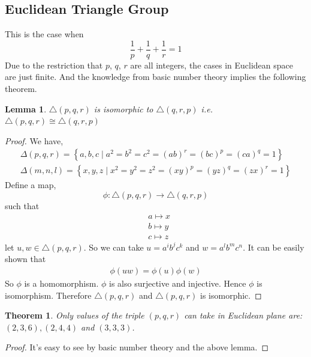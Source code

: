 \documentclass{article}
\newtheorem{Thm}{Theorem}[section]
\newtheorem{lem}{Lemma}[section]
\begin{document}
\subsection{Euclidean Triangle Group}
This is the case when $$\frac{1}{p}+\frac{1}{q}+\frac{1}{r}=1$$
Due to the restriction that $p$, $q$, $r$ are all integers, the cases in Euclidean space are just finite. And the knowledge from basic number theory implies the following theorem.
\begin{lem}
    $\triangle(p, q, r)$ is isomorphic to $\triangle(q, r, p)$ i.e. $\triangle(p, q, r) \cong \triangle(q, r, p)$
\end{lem}
\begin{proof}
    We have,
    $$
        \begin{gathered}
            \Delta(p, q, r)=\left\{a, b, c \mid a^2=b^2=c^2=(a b)^r=(b c)^p=(c a)^q=1\right\} \\
            \Delta(m, n, l)=\left\{x, y, z \mid x^2=y^2=z^2=(x y)^p=(y z)^q=(z x)^r=1\right\}
        \end{gathered}
    $$
    Define a map,
    $$
        \phi: \triangle(p, q, r) \rightarrow \triangle(q, r, p)
    $$
    such that
    $$
        \begin{aligned}
             & a \mapsto x \\
             & b \mapsto y \\
             & c \mapsto z
        \end{aligned}
    $$
    let $u, w \in \triangle(p, q, r)$. So we can take $u=a^i b^j c^k$ and $w=a^l b^m c^n$. It can be easily shown that
    $$
        \begin{aligned}
            \phi(u w) =\phi(u) \phi(w)
        \end{aligned}
    $$
    So $\phi$ is a homomorphism. $\phi$ is also surjective and injective. Hence $\phi$ is isomorphism. Therefore $\triangle(p, q, r)$ and $\triangle(p, q, r)$ is isomorphic.
\end{proof}
\begin{Thm}
    Only values of the triple $(p, q, r)$ can take in Euclidean plane are: $(2,3,6),(2,4,4)$ and $(3,3,3)$.
\end{Thm}
\begin{proof}
    It's easy to see by basic number theory and the above lemma.
\end{proof}
\end{document}
